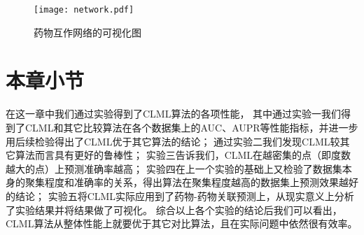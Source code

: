 \begin{figure}
    \centering
    \texttt{[image: network.pdf]}
    \caption{药物互作网络的可视化图}
    \label{experiments:fig:network}    
\end{figure}


\section{本章小节}
在这一章中我们通过实验得到了CLML算法的各项性能，
其中通过实验一我们得到了CLML和其它比较算法在各个数据集上的AUC、AUPR等性能指标，并进一步用后续检验得出了CLML优于其它算法的结论；
通过实验二我们发现CLML较其它算法而言具有更好的鲁棒性；
实验三告诉我们，CLML在越密集的点（即度数越大的点）上预测准确率越高；
实验四在上一个实验的基础上又检验了数据集本身的聚集程度和准确率的关系，得出算法在聚集程度越高的数据集上预测效果越好的结论；
实验五将CLML实际应用到了药物-药物关联预测上，从现实意义上分析了实验结果并将结果做了可视化。
综合以上各个实验的结论后我们可以看出，CLML算法从整体性能上就要优于其它对比算法，且在实际问题中依然很有效率。
